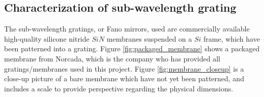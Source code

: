\subsection{Characterization of sub-wavelength grating}\label{sec:grating_characterization}

The sub-wavelength gratings, or Fano mirrors, used are commercially available high-quality silicone nitride $SiN$ membranes suspended on a $Si$ frame, which have been patterned into a grating. Figure \ref{fig:packaged_membrane} shows a packaged membrane from Norcada, which is the company who has provided all gratings/membranes used in this project. Figure \ref{fig:membrane_closeup} is a close-up picture of a bare membrane which have not yet been patterned, and includes a scale to provide perspective regarding the physical dimensions.

